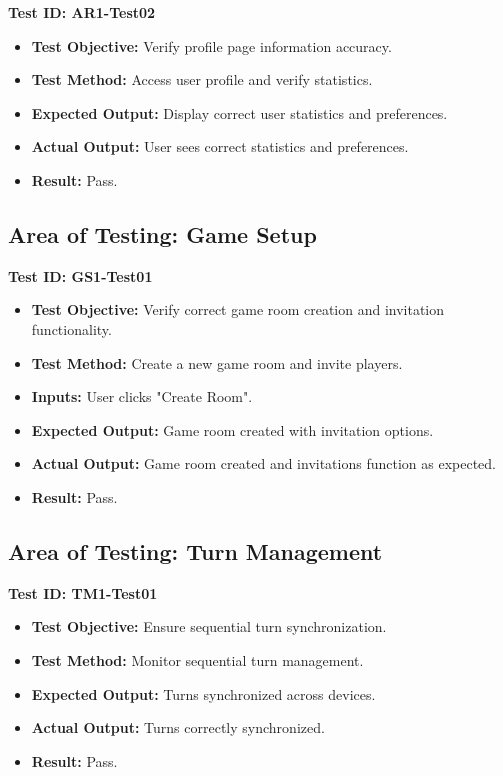 \documentclass[12pt, titlepage]{article}
\begin{document}
\textbf{Test ID: AR1-Test02}
\begin{itemize}
    \item \textbf{Test Objective:} Verify profile page information accuracy.
    \item \textbf{Test Method:} Access user profile and verify statistics.
    \item \textbf{Expected Output:} Display correct user statistics and preferences.
    \item \textbf{Actual Output:} User sees correct statistics and preferences.
    \item \textbf{Result:} Pass.
\end{itemize}

\subsection{Area of Testing: Game Setup}

\textbf{Test ID: GS1-Test01}
\begin{itemize}
    \item \textbf{Test Objective:} Verify correct game room creation and invitation functionality.
    \item \textbf{Test Method:} Create a new game room and invite players.
    \item \textbf{Inputs:} User clicks "Create Room".
    \item \textbf{Expected Output:} Game room created with invitation options.
    \item \textbf{Actual Output:} Game room created and invitations function as expected.
    \item \textbf{Result:} Pass.
\end{itemize}

\subsection{Area of Testing: Turn Management}

\textbf{Test ID: TM1-Test01}
\begin{itemize}
    \item \textbf{Test Objective:} Ensure sequential turn synchronization.
    \item \textbf{Test Method:} Monitor sequential turn management.
    \item \textbf{Expected Output:} Turns synchronized across devices.
    \item \textbf{Actual Output:} Turns correctly synchronized.
    \item \textbf{Result:} Pass.
\end{itemize}
\end{document}
